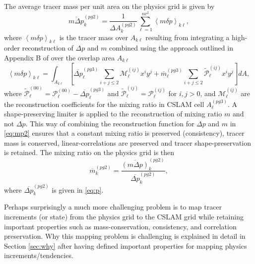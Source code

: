 \documentclass{agujournal}
\begin{document}
The average tracer mass per unit area on the physics grid is given by
\begin{equation}
\label{eq:mp}
\overline{m\Delta p}^{(pg2)}_k=\frac{1}{\Delta A^{(pg2)}_k}\sum_{\ell=1}^{nc^2}\left< m\delta p\right>_{k\ell},
\end{equation}
where $\left< m\delta p\right>_{k\ell}$ is the tracer mass over $A_{k\ell}$ resulting from integrating a high-order reconstruction of $\Delta p$ and $m$ combined using the approach outlined in Appendix B of \cite{NL2010JCP} over the overlap area $A_{k\ell}$
\begin{equation}
\label{eq:mp2}
\left< m\delta p\right>_{k\ell}=\int_{A_{k\ell}}\left[ \overline{\Delta p}_\ell^{(pg3)}\sum_{i+j\le 2}{\mathcal{M}}^{(ij)}_\ell x^{i}y^{j}+{\overline{m}}_\ell^{(pg3)}\sum_{i+j\le 2}{\widetilde{{\mathcal{P}}}}^{(ij)}_\ell x^{i}y^{j}\right] dA,
\end{equation}
where ${\widetilde{{\mathcal{P}}}}^{(00)}_\ell={\mathcal{P}}^{(00)}_\ell-\overline{\Delta p}^{(pg3)}_\ell$ and ${\widetilde{{\mathcal{P}}}}^{(ij)}_\ell={\mathcal{P}}^{(ij)}_\ell$ for $i,j>0$, and ${\mathcal{M}}^{(ij)}_\ell$ are the reconstruction coefficients for the mixing ratio in CSLAM cell $A^{(pg3)}_\ell$. A shape-preserving limiter is applied to the reconstruction of mixing ratio $m$ \citep{BJ1989} and not $\Delta p$. This way of combining the reconstruction function for $\Delta p$ and $m$ in \eqref{eq:mp2} ensures that a constant mixing ratio is preserved (consistency), tracer mass is conserved, linear-correlations are preserved and tracer shape-preservation is retained. The mixing ratio on the physics grid is then
\begin{equation}
{\overline{m}}^{(pg2)}_k=\frac{\overline{\left( m\Delta p\right)}^{(pg2)}_k}{\overline{\Delta p}^{(pg2)}_k},
\end{equation}
where $\overline{\Delta p}^{(pg2)}_k$ is given in \eqref{eq:p}. 

Perhaps surprisingly a much more challenging problem is to map tracer increments (or state) from the physics grid to the CSLAM grid while retaining important properties such as mass-conservation, consistency, and correlation preservation. Why this mapping problem is challenging is explained in detail in Section \ref{sec:why} after having defined important properties for mapping physics increments/tendencies.
\end{document}
